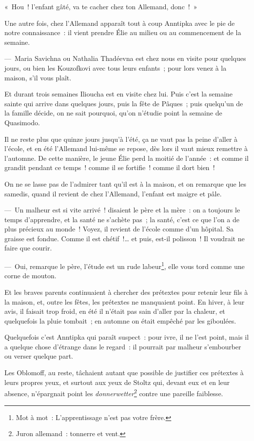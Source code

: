 \documentclass[french,twoside]{book} %
\begin{document}
« Hou ! l’enfant gâté, va te cacher chez ton Allemand, donc ! »\par
Une autre fois, chez l’Allemand apparaît tout à coup Anntipka avec le pie de notre connaissance : il vient prendre Élie au milieu ou au commencement de la semaine.\par
— Maria Savichna ou Nathalia Thadéevna est chez nous en visite pour quelques jours, ou bien les Kouzofkovi avec tous leurs enfants ; pour lors venez à la maison, s’il vous plaît.\par
Et durant trois semaines Ilioucha est en visite chez lui. Puis c’est la semaine sainte qui arrive dans quelques jours, puis la fête de Pâques ; puis quelqu’un de la famille décide, on ne sait pourquoi, qu’on n’étudie point la semaine de Quasimodo.\par
Il ne reste plus que quinze jours jusqu’à l’été, ça ne vaut pas la peine d’aller à l’école, et en été l’Allemand lui-même se repose, dès lors il vaut mieux remettre à l’automne. De cette manière, le jeune Élie perd la moitié de l’année : et comme il grandit pendant ce temps ! comme il se fortifie ! comme il dort bien !\par
On ne se lasse pas de l’admirer tant qu’il est à la maison, et on remarque que les samedis, quand il revient de chez l’Allemand, l’enfant est maigre et pâle.\par
— Un malheur est si vite arrivé ! disaient le père et la mère : on a toujours le temps d’apprendre, et la santé ne s’achète pas ; la santé, c’est ce que l’on a de plus précieux au monde ! Voyez, il revient de l’école comme d’un hôpital. Sa graisse est fondue. Comme il est chétif !… et puis, est-il polisson ! Il voudrait ne faire que courir.\par
— Oui, remarque le père, l’étude est un rude labeur\footnote{Mot à mot : L’apprentissage n’est pas votre frère.}, elle vous tord comme une corne de mouton.\par
Et les braves parents continuaient à chercher des prétextes pour retenir leur fils à la maison, et, outre les fêtes, les prétextes ne manquaient point. En hiver, à leur avis, il faisait trop froid, en été il n’était pas sain d’aller par la chaleur, et quelquefois la pluie tombait ; en automne on était empêché par les giboulées.\par
Quelquefois c’est Anntipka qui paraît suspect : pour ivre, il ne l’est point, mais il a quelque chose d’étrange dans le regard : il pourrait par malheur s’embourber ou verser quelque part.\par
Les Oblomoff, au reste, tâchaient autant que possible de justifier ces prétextes à leurs propres yeux, et surtout aux yeux de Stoltz qui, devant eux et en leur absence, n’épargnait point les \emph{donnerwetter}\footnote{Juron allemand : tonnerre et vent.} contre une pareille faiblesse.\par
\end{document}
